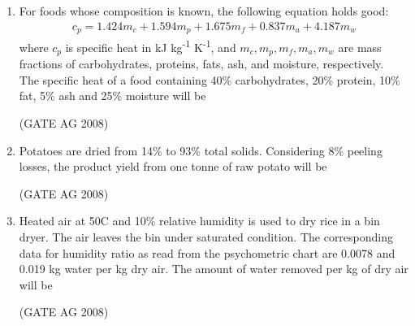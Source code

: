 \documentclass[journal]{IEEEtran}
\begin{document}
\begin{enumerate}
\medskip

\item 
 For foods whose composition is known, the following equation holds good:
\begin{align}
c_p = 1.424 m_c + 1.594 m_p + 1.675 m_f + 0.837 m_a + 4.187 m_w
\end{align}
where $c_p$ is specific heat in kJ kg\textsuperscript{-1} K\textsuperscript{-1}, and $m_c, m_p, m_f, m_a, m_w$ are mass fractions of carbohydrates, proteins, fats, ash, and moisture, respectively. \\
The specific heat of a food containing 40\% carbohydrates, 20\% protein, 10\% fat, 5\% ash and 25\% moisture will be
\begin{enumerate}
\end{enumerate}
\hfill(GATE AG 2008)\\

\medskip

\item 
 Potatoes are dried from 14\% to 93\% total solids. Considering 8\% peeling losses, the product yield from one tonne of raw potato will be
\begin{enumerate}
\end{enumerate}
\hfill(GATE AG 2008)\\

\medskip

\item 
 Heated air at 50\textdegree C and 10\% relative humidity is used to dry rice in a bin dryer. The air leaves the bin under saturated condition. The corresponding data for humidity ratio as read from the psychometric chart are 0.0078 and 0.019 kg water per kg dry air. The amount of water removed per kg of dry air will be
\begin{enumerate}
\end{enumerate}
\hfill(GATE AG 2008)\\


\end{enumerate}
\end{document}
